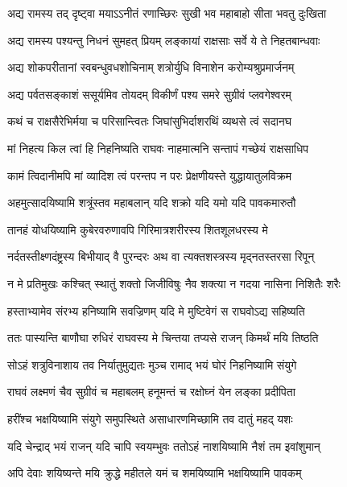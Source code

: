 \twolineshloka
{अद्य रामस्य तद् दृष्ट्वा मयाऽऽनीतं रणाच्छिरः}
{सुखी भव महाबाहो सीता भवतु दुःखिता} %

\twolineshloka
{अद्य रामस्य पश्यन्तु निधनं सुमहत् प्रियम्}
{लङ्कायां राक्षसाः सर्वे ये ते निहतबान्धवाः} %

\twolineshloka
{अद्य शोकपरीतानां स्वबन्धुवधशोचिनाम्}
{शत्रोर्युधि विनाशेन करोम्यश्रुप्रमार्जनम्} %

\twolineshloka
{अद्य पर्वतसङ्काशं ससूर्यमिव तोयदम्}
{विकीर्णं पश्य समरे सुग्रीवं प्लवगेश्वरम्} %

\twolineshloka
{कथं च राक्षसैरेभिर्मया च परिसान्त्वितः}
{जिघांसुभिर्दाशरथिं व्यथसे त्वं सदानघ} %

\twolineshloka
{मां निहत्य किल त्वां हि निहनिष्यति राघवः}
{नाहमात्मनि सन्तापं गच्छेयं राक्षसाधिप} %

\twolineshloka
{कामं त्विदानीमपि मां व्यादिश त्वं परन्तप}
{न परः प्रेक्षणीयस्ते युद्धायातुलविक्रम} %

\twolineshloka
{अहमुत्सादयिष्यामि शत्रूंस्तव महाबलान्}
{यदि शक्रो यदि यमो यदि पावकमारुतौ} %

\twolineshloka
{तानहं योधयिष्यामि कुबेरवरुणावपि}
{गिरिमात्रशरीरस्य शितशूलधरस्य मे} %

\twolineshloka
{नर्दतस्तीक्ष्णदंष्ट्रस्य बिभीयाद् वै पुरन्दरः}
{अथ वा त्यक्तशस्त्रस्य मृद्नतस्तरसा रिपून्} %

\twolineshloka
{न मे प्रतिमुखः कश्चित् स्थातुं शक्तो जिजीविषुः}
{नैव शक्त्या न गदया नासिना निशितैः शरैः} %

\twolineshloka
{हस्ताभ्यामेव संरभ्य हनिष्यामि सवज्रिणम्}
{यदि मे मुष्टिवेगं स राघवोऽद्य सहिष्यति} %

\twolineshloka
{ततः पास्यन्ति बाणौघा रुधिरं राघवस्य मे}
{चिन्तया तप्यसे राजन् किमर्थं मयि तिष्ठति} %

\twolineshloka
{सोऽहं शत्रुविनाशाय तव निर्यातुमुद्यतः}
{मुञ्च रामाद् भयं घोरं निहनिष्यामि संयुगे} %

\twolineshloka
{राघवं लक्ष्मणं चैव सुग्रीवं च महाबलम्}
{हनूमन्तं च रक्षोघ्नं येन लङ्का प्रदीपिता} %

\twolineshloka
{हरींश्च भक्षयिष्यामि संयुगे समुपस्थिते}
{असाधारणमिच्छामि तव दातुं महद् यशः} %

\twolineshloka
{यदि चेन्द्राद् भयं राजन् यदि चापि स्वयम्भुवः}
{ततोऽहं नाशयिष्यामि नैशं तम इवांशुमान्} %

\twolineshloka
{अपि देवाः शयिष्यन्ते मयि क्रुद्धे महीतले}
{यमं च शमयिष्यामि भक्षयिष्यामि पावकम्} %

